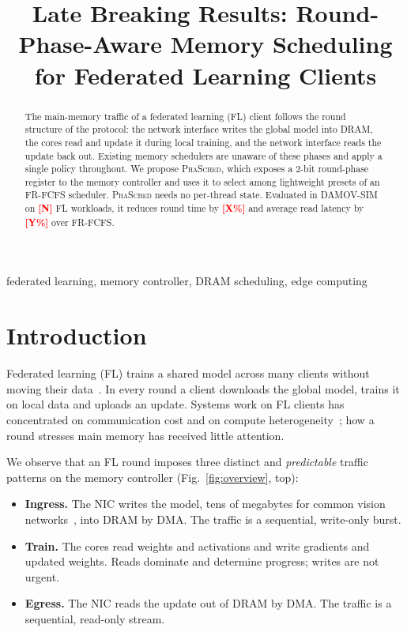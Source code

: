 \documentclass[conference]{IEEEtran}
\newcommand{\tbd}[1]{\textcolor{red}{\textbf{[#1]}}}
\newcommand{\name}{\textsc{PhaSched}}
\begin{document}
\title{Late Breaking Results: Round-Phase-Aware Memory Scheduling for Federated Learning Clients}

\author{
}

\maketitle

\begin{abstract}
The main-memory traffic of a federated learning (FL) client follows the round structure of the protocol: the network interface writes the global model into DRAM, the cores read and update it during local training, and the network interface reads the update back out. Existing memory schedulers are unaware of these phases and apply a single policy throughout. We propose \name{}, which exposes a 2-bit round-phase register to the memory controller and uses it to select among lightweight presets of an FR-FCFS scheduler. \name{} needs no per-thread state. Evaluated in DAMOV-SIM on \tbd{N} FL workloads, it reduces round time by \tbd{X\%} and average read latency by \tbd{Y\%} over FR-FCFS.
\end{abstract}

\begin{IEEEkeywords}
federated learning, memory controller, DRAM scheduling, edge computing
\end{IEEEkeywords}

\section{Introduction}
Federated learning (FL) trains a shared model across many clients without moving their data~\cite{fedavg}. In every round a client downloads the global model, trains it on local data and uploads an update. Systems work on FL clients has concentrated on communication cost and on compute heterogeneity~\cite{flscale,flopen}; how a round stresses main memory has received little attention.

We observe that an FL round imposes three distinct and \emph{predictable} traffic patterns on the memory controller (Fig.~\ref{fig:overview}, top):
\begin{itemize}
\item \textbf{Ingress.} The NIC writes the model, tens of megabytes for common vision networks~\cite{resnet}, into DRAM by DMA. The traffic is a sequential, write-only burst.
\item \textbf{Train.} The cores read weights and activations and write gradients and updated weights. Reads dominate and determine progress; writes are not urgent.
\item \textbf{Egress.} The NIC reads the update out of DRAM by DMA. The traffic is a sequential, read-only stream.
\end{itemize}
\end{document}
